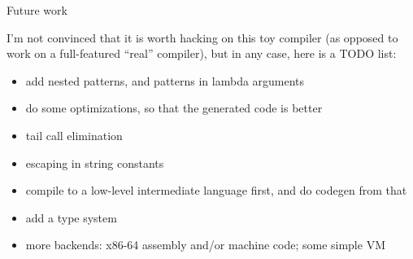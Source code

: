 \documentclass{beamer}
\begin{document}

\begin{frame}{Future work}

I'm not convinced that it is worth hacking on this toy compiler (as opposed to work
on a full-featured ``real'' compiler), but in any case, here is a TODO list:\\[10pt]

\begin{itemize}
\item add nested patterns, and patterns in lambda arguments
\item do some optimizations, so that the generated code is better
\item tail call elimination
\item escaping in string constants
\item compile to a low-level intermediate language first, and do codegen from that
\item add a type system
\item more backends: x86-64 assembly and/or machine code; some simple VM
\end{itemize}

\end{frame}


\end{document}
